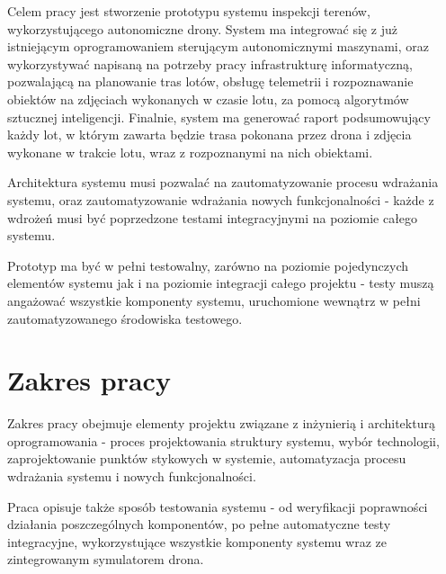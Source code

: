 Celem pracy jest stworzenie prototypu systemu inspekcji terenów, wykorzystującego
autonomiczne drony. System ma integrować się z już istniejącym oprogramowaniem
sterującym autonomicznymi maszynami, oraz wykorzystywać napisaną na potrzeby pracy
infrastrukturę informatyczną, pozwalającą na planowanie tras lotów, obsługę telemetrii
i rozpoznawanie obiektów na zdjęciach wykonanych w czasie lotu, za pomocą algorytmów
sztucznej inteligencji. Finalnie, system ma generować raport podsumowujący każdy lot,
w którym zawarta będzie trasa pokonana przez drona i zdjęcia wykonane w trakcie lotu,
wraz z rozpoznanymi na nich obiektami. 

Architektura systemu musi pozwalać na zautomatyzowanie procesu wdrażania
systemu, oraz zautomatyzowanie wdrażania nowych funkcjonalności - każde
z wdrożeń musi być poprzedzone testami integracyjnymi na poziomie całego systemu. 

Prototyp ma być w pełni testowalny, zarówno na poziomie pojedynczych
elementów systemu jak i na poziomie integracji całego projektu - testy muszą
angażować wszystkie komponenty systemu, uruchomione wewnątrz w pełni
zautomatyzowanego środowiska testowego.

\section{Zakres pracy} \label{intro_scope}

Zakres pracy obejmuje elementy projektu związane z
inżynierią i architekturą oprogramowania - proces projektowania struktury systemu,
wybór technologii, zaprojektowanie punktów stykowych w systemie, automatyzacja
procesu wdrażania systemu i nowych funkcjonalności.

Praca opisuje także sposób testowania systemu - od weryfikacji poprawności działania
poszczególnych komponentów, po pełne automatyczne testy integracyjne, wykorzystujące 
wszystkie komponenty systemu wraz ze zintegrowanym symulatorem drona. 
